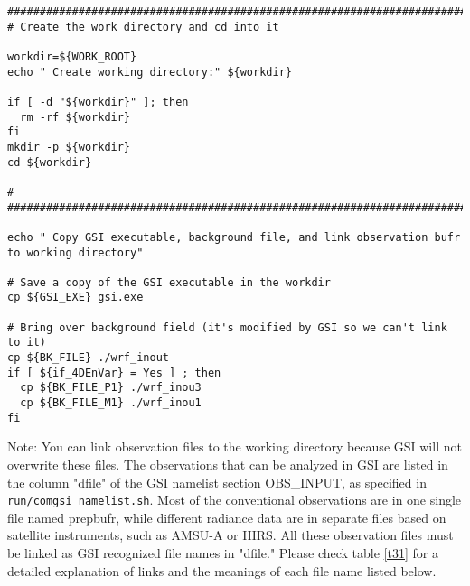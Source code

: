 \begin{scriptsize}
\begin{verbatim} 
##################################################################################
# Create the work directory and cd into it

workdir=${WORK_ROOT}
echo " Create working directory:" ${workdir}

if [ -d "${workdir}" ]; then
  rm -rf ${workdir}
fi
mkdir -p ${workdir}
cd ${workdir}

#
##################################################################################

echo " Copy GSI executable, background file, and link observation bufr to working directory"

# Save a copy of the GSI executable in the workdir
cp ${GSI_EXE} gsi.exe

# Bring over background field (it's modified by GSI so we can't link to it)
cp ${BK_FILE} ./wrf_inout
if [ ${if_4DEnVar} = Yes ] ; then
  cp ${BK_FILE_P1} ./wrf_inou3
  cp ${BK_FILE_M1} ./wrf_inou1
fi
\end{verbatim}
\end{scriptsize}

Note: You can link observation files to the working directory because GSI will not overwrite these files. The observations that can be analyzed in GSI are listed in the column "dfile" of the GSI namelist section OBS\_INPUT, as specified in \verb|run/comgsi_namelist.sh|. Most of the conventional observations are in one single file named prepbufr, while different radiance data are in separate files based on satellite instruments, such as AMSU-A or HIRS. All these observation files must be linked as GSI recognized file names in "dfile." Please check table \ref{t31} for a detailed explanation of links and the meanings of each file name listed below.

